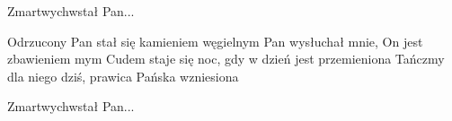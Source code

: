 \documentclass[../../../songbook.tex]{subfiles}
\begin{document}
\-\hspace{1cm}	Zmartwychwstał Pan...				 \newline

Odrzucony Pan stał się kamieniem węgielnym				 \newline
Pan wysłuchał mnie, On jest zbawieniem mym				 \newline
Cudem staje się noc, gdy w dzień jest przemieniona				 \newline
Tańczmy dla niego dziś, prawica Pańska wzniesiona				 \newline

\-\hspace{1cm} Zmartwychwstał Pan...				 \newline
\end{document}
